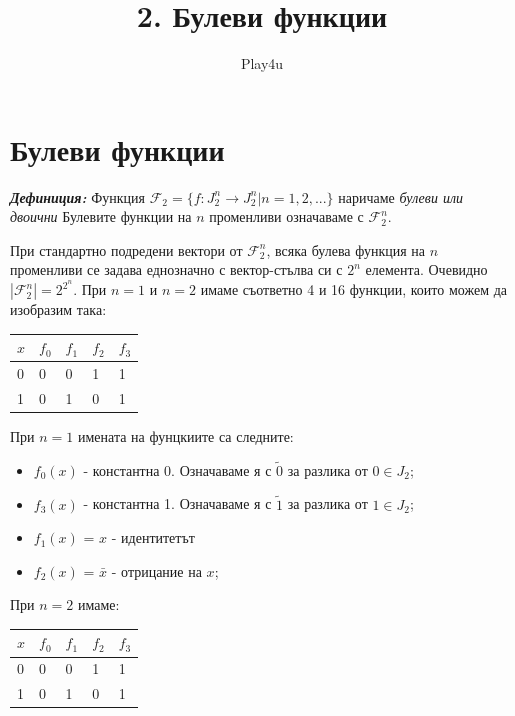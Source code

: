\documentclass[11pt]{article} %
\title{2. Булеви функции}
\author{Play4u}
\newcommand{\italicBold}[1]{\textbf{\emph{#1}}}
\newcommand{\definition}{\italicBold{Дефиниция: }}
\newcommand{\curlies}[1]{\{#1\}}
\begin{document}
\maketitle

\section{Булеви функции}
\definition Функция $\mathcal{F}_{2} = \curlies{f:J^{n}_{2} \to J^{n}_{2} | n = 1, 2, ...}$ наричаме \textit{булеви или двоични} Булевите функции на $n$ променливи означаваме с $\mathcal{F}^{n}_{2}$. \par

При стандартно подредени вектори от $\mathcal{F}^{n}_{2}$, всяка булева функция на $n$ променливи се задава еднозначно с вектор-стълва си с $2^{n}$ елемента. Очевидно $|\mathcal{F}^{n}_{2}| = 2^{2^n}$. При $n = 1$ и $n = 2$ имаме съответно 4 и 16 функции, които можем да изобразим така: 

\begin{table}[!ht]
\centering
\begin{tabular}{|l|llll|}
\hline
$x$ & $f_{0}$ & $f_{1}$ & $f_{2}$ &  $f_{3}$\\ \hline
0 & 0 & 0 & 1 & 1  \\
1 & 0 & 1 & 0 & 1 \\ \hline
\end{tabular}
\end{table}

При $n = 1$ имената на фунцкиите са следните: \\
\begin{itemize}
	\item $f_{0}(x)$ - константна 0. Означаваме я с $\tilde{0}$ за разлика от $0 \in J_{2}$; \\
	\item $f_{3}(x)$ - константна 1. Означаваме я с $\tilde{1}$ за разлика от $1 \in J_{2}$; \\
	\item $f_{1}(x)$ = $x$ - идентитетът \\
	\item $f_{2}(x)$ = $\bar{x}$ - отрицание на $x$; 
\end{itemize} \par

При $n = 2$ имаме: 
\begin{table}[!ht]
\centering
\begin{tabular}{|l|llll|}
\hline
$x$ & $f_{0}$ & $f_{1}$ & $f_{2}$ &  $f_{3}$\\ \hline
0 & 0 & 0 & 1 & 1  \\
1 & 0 & 1 & 0 & 1 \\ \hline
\end{tabular}
\end{table}
\end{document}
